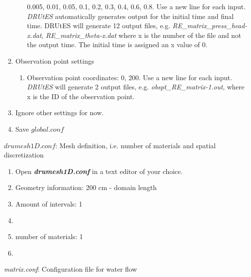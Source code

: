 \begin{enumerate}
\begin{enumerate}
0.005,
0.01,
0.05,
0.1,
0.2,
0.3,
0.4,
0.6,
0.8. Use a new line for each input. \textit{DRUtES} automatically generates output for the initial time and final time. DRUtES will generate 12 output files, e.g. \textit{RE\_matrix\_press\_head-x.dat}, \textit{RE\_matrix\_theta-x.dat} where x is the number of the file and not the output time. The initial time is assigned an x value of 0. 
\end{enumerate}
\item Observation point settings \begin{enumerate}
\item Observation point coordinates: 0, 200. Use a new line for each input. \textit{DRUtES} will generate 2 output files, e.g. \textit{obspt\_RE\_matrix-1.out}, where x is the ID of the observation point. 
\end{enumerate}
\item Ignore other settings for now. 
\item Save $global.conf$
\end{enumerate}


$drumesh1D.conf$: Mesh definition, i.e. number of materials and spatial discretization
\begin{enumerate}
\item Open \textbf{\emph{drumesh1D.conf}} in a text editor of your choice. 
\item Geometry information: 200 cm - domain length
\item Amount of intervals: 1
\item
{}
\item number of materials: 1
\item {}
\end{enumerate}

\emph{matrix.conf}: Configuration file for water flow 


